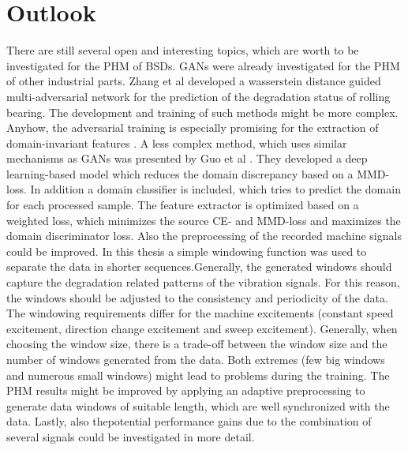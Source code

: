 \chapter{Outlook}
There are still several open and interesting topics, which are worth to be investigated for the PHM of BSDs. GANs were already investigated for the PHM of other industrial parts. Zhang et al \cite{Zhang2019} developed a wasserstein distance guided multi-adversarial network for the prediction of the degradation status of rolling bearing. The development and training of such methods might be more complex. Anyhow, the adversarial training is especially promising for the extraction of domain-invariant features \cite{Zhang2019}. A less complex method, which uses similar mechanisms as GANs was presented by Guo et al \cite{Guo2019}. They developed a deep learning-based model which reduces the domain discrepancy based on a MMD-loss. In addition a domain classifier is included, which tries to predict the domain for each processed sample. The feature extractor is optimized based on a weighted loss, which minimizes the source CE- and MMD-loss and maximizes the domain discriminator loss. Also the preprocessing of the recorded machine signals could be improved. In this thesis a simple windowing function was used to separate the data in shorter sequences.Generally, the generated windows should capture the degradation related patterns of the vibration signals. For this reason, the windows should be adjusted to the consistency and periodicity of the data. The windowing requirements differ for the machine excitements (constant speed excitement, direction change excitement and sweep excitement). Generally, when choosing the window size, there is a trade-off between the window size and the number of windows generated from the data. Both extremes (few big windows and numerous small windows) might lead to problems during the training. The PHM results might be improved by applying an adaptive preprocessing to generate data windows of suitable length, which are well synchronized with the data. Lastly, also thepotential performance gains due to the combination of several signals could be investigated in more detail.